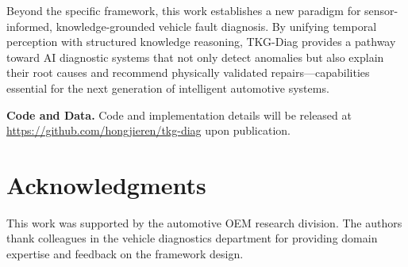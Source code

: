 \documentclass[11pt,a4paper]{article}
\begin{document}
Beyond the specific framework, this work establishes a new paradigm for sensor-informed, knowledge-grounded vehicle fault diagnosis. By unifying temporal perception with structured knowledge reasoning, TKG-Diag provides a pathway toward AI diagnostic systems that not only detect anomalies but also explain their root causes and recommend physically validated repairs---capabilities essential for the next generation of intelligent automotive systems.

\vspace{0.5cm}
\noindent\textbf{Code and Data.} Code and implementation details will be released at \url{https://github.com/hongjieren/tkg-diag} upon publication.

\section*{Acknowledgments}
This work was supported by the automotive OEM research division. The authors thank colleagues in the vehicle diagnostics department for providing domain expertise and feedback on the framework design.


\end{document}
